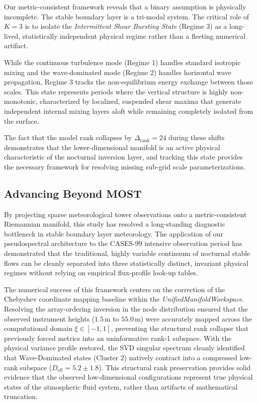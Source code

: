 \documentclass[11pt,a4paper]{article}
\begin{document}
Our metric-consistent framework reveals that a binary assumption is physically incomplete. The stable boundary layer is a tri-modal system. The critical role of $K=3$ is to isolate the \emph{Intermittent Shear Bursting State} (Regime 3) as a long-lived, statistically independent physical regime rather than a fleeting numerical artifact. 

While the continuous turbulence mode (Regime 1) handles standard isotropic mixing and the wave-dominated mode (Regime 2) handles horizontal wave propagation, Regime 3 tracks the non-equilibrium energy exchange between those scales. This state represents periods where the vertical structure is highly non-monotonic, characterized by localized, suspended shear maxima that generate independent internal mixing layers aloft while remaining completely isolated from the surface. 

The fact that the model rank collapses by $\Delta_{\mathrm{rank}} = 24$ during these shifts demonstrates that the lower-dimensional manifold is an active physical characteristic of the nocturnal inversion layer, and tracking this state provides the necessary framework for resolving missing sub-grid scale parameterizations.

\subsection{Advancing Beyond MOST}

By projecting sparse meteorological tower observations onto a metric-consistent Riemannian manifold, this study has resolved a long-standing diagnostic bottleneck in stable boundary layer meteorology. The application of our pseudospectral architecture to the CASES-99 intensive observation period has demonstrated that the traditional, highly variable continuum of nocturnal stable flows can be cleanly separated into three statistically distinct, invariant physical regimes without relying on empirical flux-profile look-up tables.

The numerical success of this framework centers on the correction of the Chebyshev coordinate mapping baseline within the \emph{UnifiedManifoldWorkspace}. Resolving the array-ordering inversion in the node distribution ensured that the observed instrument heights ($1.5\,\text{m}$ to $55.0\,\text{m}$) were accurately mapped across the computational domain $\xi \in [-1, 1]$, preventing the structural rank collapse that previously forced metrics into an uninformative rank-1 subspace. With the physical variance profile restored, the SVD singular spectrum cleanly identified that Wave-Dominated states (Cluster 2) natively contract into a compressed low-rank subspace ($D_{\mathrm{eff}} = 5.2 \pm 1.8$). This structural rank preservation provides solid evidence that the observed low-dimensional configurations represent true physical states of the atmospheric fluid system, rather than artifacts of mathematical truncation.
\end{document}
